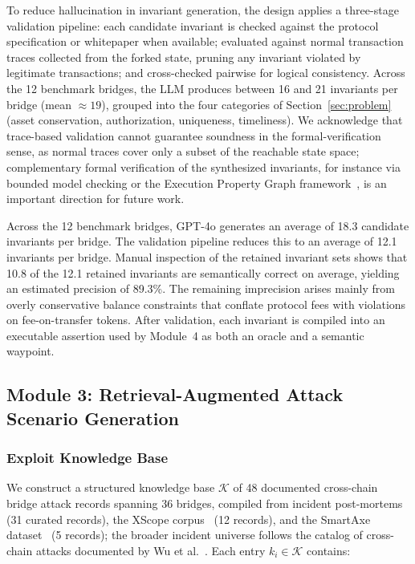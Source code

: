 \documentclass[journal]{IEEEtran}
\begin{document}
To reduce hallucination in invariant generation, the design applies a three-stage validation pipeline: each candidate invariant is checked against the protocol specification or whitepaper when available; evaluated against normal transaction traces collected from the forked state, pruning any invariant violated by legitimate transactions; and cross-checked pairwise for logical consistency. Across the 12 benchmark bridges, the LLM produces between 16 and 21 invariants per bridge (mean $\approx 19$), grouped into the four categories of Section~\ref{sec:problem} (asset conservation, authorization, uniqueness, timeliness). %
We acknowledge that trace-based validation cannot guarantee soundness in the formal-verification sense, as normal traces cover only a subset of the reachable state space; complementary formal verification of the synthesized invariants, for instance via bounded model checking or the Execution Property Graph framework~\cite{qin2025epg}, is an important direction for future work.

Across the 12 benchmark bridges, GPT-4o generates an average of 18.3 candidate invariants per bridge. The validation pipeline reduces this to an average of 12.1 invariants per bridge. Manual inspection of the retained invariant sets shows that 10.8 of the 12.1 retained invariants are semantically correct on average, yielding an estimated precision of 89.3\%. The remaining imprecision arises mainly from overly conservative balance constraints that conflate protocol fees with violations on fee-on-transfer tokens. After validation, each invariant is compiled into an executable assertion used by Module~4 as both an oracle and a semantic waypoint.

\subsection{Module 3: Retrieval-Augmented Attack Scenario Generation}

\subsubsection{Exploit Knowledge Base}

We construct a structured knowledge base $\mathcal{K}$ of 48 documented cross-chain bridge attack records spanning 36 bridges, compiled from incident post-mortems (31 curated records), the XScope corpus~\cite{zhang2022xscope} (12 records), and the SmartAxe dataset~\cite{liao2024smartaxe} (5 records); the broader incident universe follows the catalog of cross-chain attacks documented by Wu et al.~\cite{wu2025safeguarding}.
Each entry $k_i \in \mathcal{K}$ contains:
\end{document}
